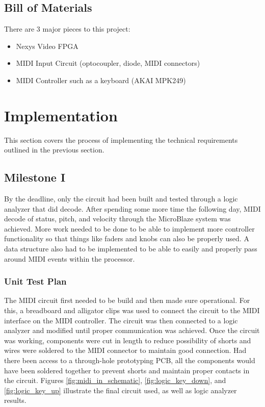 \documentclass[12pt]{article}
\begin{document}
\subsection{Bill of Materials}

There are 3 major pieces to this project:

\begin{itemize}
    \item Nexys Video FPGA
    \item MIDI Input Circuit (optocoupler, diode, MIDI connectors)
    \item MIDI Controller such as a keyboard (AKAI MPK249)
\end{itemize}


\section{Implementation}

This section covers the process of implementing the technical requirements outlined in the previous section.

\subsection{Milestone I}

By the deadline, only the circuit had been built and tested through a logic analyzer that did decode. After spending some more time the following day, MIDI decode of status, pitch, and velocity through the MicroBlaze system was achieved. More work needed to be done to be able to implement more controller functionality so that things like faders and knobs can also be properly used. A data structure also had to be implemented to be able to easily and properly pass around MIDI events within the processor.

\subsubsection{Unit Test Plan}

The MIDI circuit first needed to be build and then made sure operational. For this, a breadboard and alligator clips was used to connect the circuit to the MIDI interface on the MIDI controller. The circuit was then connected to a logic analyzer and modified until proper communication was achieved. Once the circuit was working, components were cut in length to reduce possibility of shorts and wires were soldered to the MIDI connector to maintain good connection. Had there been access to a through-hole prototyping PCB, all the components would have been soldered together to prevent shorts and maintain proper contacts in the circuit. Figures \ref{fig:midi_in_schematic}, \ref{fig:logic_key_down}, and \ref{fig:logic_key_up} illustrate the final circuit used, as well as logic analyzer results.
\end{document}
